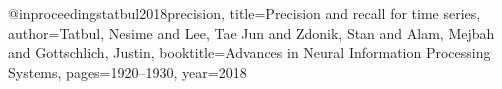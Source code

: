 @inproceedings{tatbul2018precision,
  title={Precision and recall for time series},
  author={Tatbul, Nesime and Lee, Tae Jun and Zdonik, Stan and Alam, Mejbah and Gottschlich, Justin},
  booktitle={Advances in Neural Information Processing Systems},
  pages={1920--1930},
  year={2018}
}